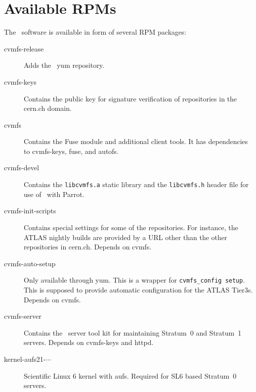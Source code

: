 \chapter{Available RPMs}
\label{apx:rpms}

The \cvmfs\ software is available in form of several RPM packages:
\begin{description}
	\item[cvmfs-release] Adds the \cvmfs\ yum repository.
	\item[cvmfs-keys] Contains the public key for signature verification of repositories in the cern.ch domain.
	\item[cvmfs] Contains the Fuse module and additional client tools.  It has dependencies to cvmfs-keys, fuse, and autofs.
	\item[cvmfs-devel] Contains the \texttt{libcvmfs.a} static library and the \texttt{libcvmfs.h} header file for use of \cvmfs\ with Parrot\cite{parrot05}.
	\item[cvmfs-init-scripts] Contains special settings for some of the repositories.
		For instance, the ATLAS nightly builds are provided by a URL other than the other repositories in cern.ch.
		Depends on cvmfs.
	\item[cvmfs-auto-setup] Only available through yum. 
		This is a wrapper for \texttt{cvmfs\_config setup}. 
		This is supposed to provide automatic configuration for the ATLAS Tier3s.
		Depends on cvmfs.
	\item[cvmfs-server] Contains the \cvmfs\ server tool kit for maintaining Stratum~0 and Stratum~1 servers.
		Depends on cvmfs-keys and httpd.
	\item[kernel-aufs21-$\cdots$] Scientific Linux 6 kernel with aufs.
		Required for SL6 based Stratum~0 servers.
\end{description}
